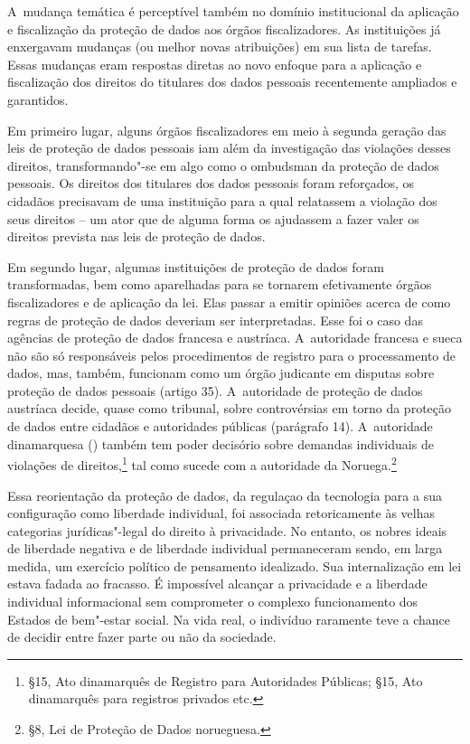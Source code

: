 A~mudança temática é perceptível também no domínio institucional da
aplicação e fiscalização da proteção de dados aos órgãos fiscalizadores.
As instituições já enxergavam mudanças (ou melhor novas atribuições) em
sua lista de tarefas. Essas mudanças eram respostas diretas ao novo
enfoque para a aplicação e fiscalização dos direitos do titulares dos
dados pessoais recentemente ampliados e garantidos.

Em primeiro lugar, alguns órgãos fiscalizadores em meio à segunda
geração das leis de proteção de dados pessoais iam além da investigação
das violações desses direitos, transformando"-se em algo como o ombudsman
da proteção de dados pessoais. Os direitos dos titulares dos dados
pessoais foram reforçados, os cidadãos precisavam de uma instituição
para a qual relatassem a violação dos seus direitos -- um ator que de
alguma forma os ajudassem a fazer valer os direitos prevista nas leis de
proteção de dados.

Em segundo lugar, algumas instituições de proteção de dados foram
transformadas, bem como aparelhadas para se tornarem efetivamente órgãos
fiscalizadores e de aplicação da lei. Elas passar a emitir opiniões
acerca de como regras de proteção de dados deveriam ser interpretadas.
Esse foi o caso das agências de proteção de dados francesa e austríaca.
A~autoridade francesa e sueca não são só responsáveis pelos
procedimentos de registro para o processamento de dados, mas, também,
funcionam como um órgão judicante em disputas sobre proteção de dados
pessoais (artigo 35). A~autoridade de proteção de dados austríaca
decide, quase como tribunal, sobre controvérsias em torno da proteção de
dados entre cidadãos e autoridades públicas (parágrafo 14). A~autoridade
dinamarquesa () também tem poder decisório sobre demandas individuais
de violações de direitos,\footnote{§15, Ato dinamarquês de Registro para
  Autoridades Públicas; §15, Ato dinamarquês para registros privados
  etc.} tal como sucede com a autoridade da Noruega.\footnote{§8, Lei de
  Proteção de Dados norueguesa.}

Essa reorientação da proteção de dados, da regulaçao da tecnologia para
a sua configuração como liberdade individual, foi associada
retoricamente às velhas categorias jurídicas"-legal do direito à
privacidade. No entanto, os nobres ideais de liberdade negativa e de
liberdade individual permaneceram sendo, em larga medida, um exercício
político de pensamento idealizado. Sua internalização em lei estava
fadada ao fracasso. É impossível alcançar a privacidade e a liberdade
individual informacional sem comprometer o complexo funcionamento dos
Estados de bem"-estar social. Na vida real, o indivíduo raramente teve a
chance de decidir entre fazer parte ou não da sociedade.

